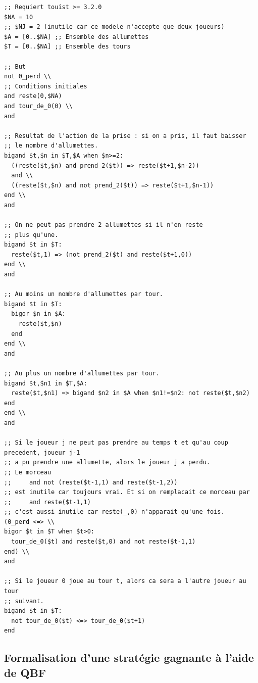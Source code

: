 \begin{lstlisting}[language=touist,frame=single]
;; Requiert touist >= 3.2.0
$NA = 10
;; $NJ = 2 (inutile car ce modele n'accepte que deux joueurs)
$A = [0..$NA] ;; Ensemble des allumettes
$T = [0..$NA] ;; Ensemble des tours

;; But
not 0_perd \\
;; Conditions initiales
and reste(0,$NA)
and tour_de_0(0) \\
and

;; Resultat de l'action de la prise : si on a pris, il faut baisser
;; le nombre d'allumettes.
bigand $t,$n in $T,$A when $n>=2:
  ((reste($t,$n) and prend_2($t)) => reste($t+1,$n-2))
  and \\
  ((reste($t,$n) and not prend_2($t)) => reste($t+1,$n-1))
end \\
and

;; On ne peut pas prendre 2 allumettes si il n'en reste
;; plus qu'une.
bigand $t in $T:
  reste($t,1) => (not prend_2($t) and reste($t+1,0))
end \\
and

;; Au moins un nombre d'allumettes par tour.
bigand $t in $T:
  bigor $n in $A:
    reste($t,$n)
  end
end \\
and

;; Au plus un nombre d'allumettes par tour.
bigand $t,$n1 in $T,$A:
  reste($t,$n1) => bigand $n2 in $A when $n1!=$n2: not reste($t,$n2) end
end \\
and

;; Si le joueur j ne peut pas prendre au temps t et qu'au coup precedent, joueur j-1
;; a pu prendre une allumette, alors le joueur j a perdu.
;; Le morceau
;;     and not (reste($t-1,1) and reste($t-1,2))
;; est inutile car toujours vrai. Et si on remplacait ce morceau par
;;     and reste($t-1,1)
;; c'est aussi inutile car reste(_,0) n'apparait qu'une fois.
(0_perd <=> \\
bigor $t in $T when $t>0:
  tour_de_0($t) and reste($t,0) and not reste($t-1,1)
end) \\
and

;; Si le joueur 0 joue au tour t, alors ca sera a l'autre joueur au tour
;; suivant.
bigand $t in $T:
  not tour_de_0($t) <=> tour_de_0($t+1)
end
\end{lstlisting}

\subsection{Formalisation d'une stratégie gagnante à l'aide de QBF}

